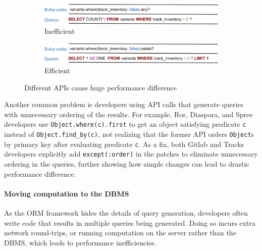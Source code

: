 \begin{figure}
  \centering
  \begin{subfigure}
    \centering
    \includegraphics[width=0.5\columnwidth]{figs/spreeAny}
    \caption{Inefficient}
    \label{fig:spreeAny}
  \end{subfigure}
  
  \begin{subfigure}
      \centering
      \includegraphics[width=0.5\columnwidth]{figs/spreeExists}
      \caption{Efficient}
      \label{fig:spreeExists}
  \end{subfigure}
  \caption{Different APIs cause huge performance difference}
  \label{fig:spreeAnyVsExists}
\end{figure}

Another common problem is developers using API calls that generate queries with unnecessary ordering of the results. For example, Ror, Diaspora, and Spree developers use \texttt{Object.}\texttt{where(c).first} to get an object satisfying predicate \texttt{c} instead of \texttt{Object.find\_by(c)}, not realizing that the former API orders {\tt Object}s by primary key after evaluating predicate {\tt c}. 
As a fix, both Gitlab and Tracks developers explicitly add \texttt{except(:order)} in 
the patches to eliminate unnecessary ordering in the queries, further showing how simple changes can lead to drastic performance difference.

\vspace{-0.08in} 
\paragraph{\bf{Moving computation to the DBMS}} %
As the ORM framework hides the details of query generation, developers often write code that results in multiple queries being generated. Doing so incurs extra network round-trips, or running computation on the server rather than the DBMS, which leads to performance inefficiencies.

